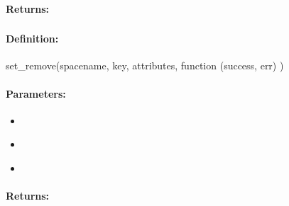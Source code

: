 \paragraph{Returns:}


\pagebreak
\subsubsection{}
\label{api:nodejs:set_remove}


\paragraph{Definition:}
\begin{javascriptcode}
set_remove(spacename, key, attributes, function (success, err) {})
\end{javascriptcode}
\paragraph{Parameters:}
\begin{itemize}[noitemsep]
\item {}\\

\item {}\\

\item {}\\

\end{itemize}

\paragraph{Returns:}


\pagebreak
\subsubsection{}
\label{api:nodejs:cond_set_remove}


